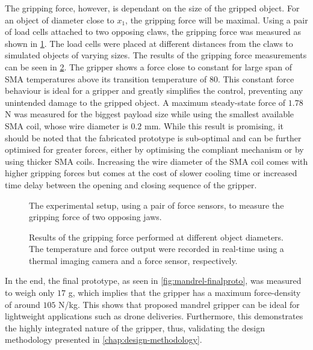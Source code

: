 The gripping force, however, is dependant on the size of the gripped object. For an object of diameter close to $x_1$, the gripping force will be maximal. Using a pair of load cells attached to two opposing claws, the gripping force was measured as shown in \cref{fig:mandrel-forcesetup}. The load cells were placed at different distances from the claws to simulated objects of varying sizes. The results of the gripping force measurements can be seen in \cref{fig:mandrel-force-temp}. The gripper shows a force close to constant for large span of SMA temperatures above its transition temperature of 80\degreeC. This constant force behaviour is ideal for a gripper and greatly simplifies the control, preventing any unintended damage to the gripped object. A maximum steady-state force of $1.78$ N was measured for the biggest payload size while using the smallest available SMA coil, whose wire diameter is $0.2$ mm. While this result is promising, it should be noted that the fabricated prototype is sub-optimal and can be further optimised for greater forces, either by optimising the compliant mechanism or by using thicker SMA coils. Increasing the wire diameter of the SMA coil comes with higher gripping forces but comes at the cost of slower cooling time or increased time delay between the opening and closing sequence of the gripper.

\begin{figure}[hbt!]
    \centering
    \resizebox{\textwidth}{!}{}
    \caption{The experimental setup, using a pair of force sensors, to measure the gripping force of two opposing jaws.}
    \label{fig:mandrel-forcesetup}
\end{figure}

\begin{figure}[hbt!] %
  \centering
  \resizebox{0.7\textwidth}{!}{}
  \caption{Results of the gripping force performed at different object diameters. The temperature and force output were recorded in real-time using a thermal imaging camera and a force sensor, respectively.}
  \label{fig:mandrel-force-temp}
\end{figure}

In the end, the final prototype, as seen in \cref{fig:mandrel-finalproto}, was measured to weigh only $17$ g, which implies that the gripper has a maximum force-density of around $105$ N/kg. This shows that proposed mandrel gripper can be ideal for lightweight applications such as drone deliveries. Furthermore, this demonstrates the highly integrated nature of the gripper, thus, validating the design methodology presented in \cref{chap:design-methodology}.
